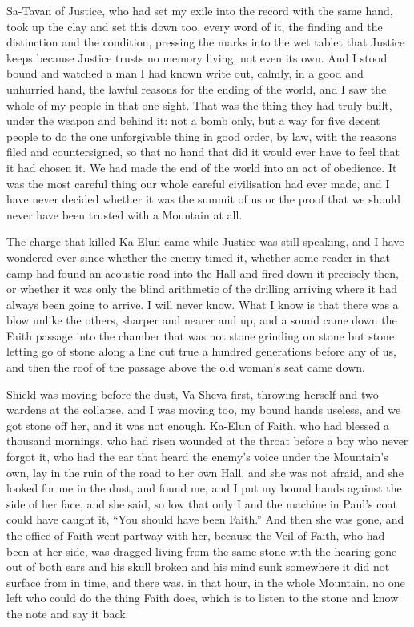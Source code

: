 Sa-Tavan of Justice, who had set my exile into the record with the same hand, took up the clay and set this down too, every word of it, the finding and the distinction and the condition, pressing the marks into the wet tablet that Justice keeps because Justice trusts no memory living, not even its own. And I stood bound and watched a man I had known write out, calmly, in a good and unhurried hand, the lawful reasons for the ending of the world, and I saw the whole of my people in that one sight. That was the thing they had truly built, under the weapon and behind it: not a bomb only, but a way for five decent people to do the one unforgivable thing in good order, by law, with the reasons filed and countersigned, so that no hand that did it would ever have to feel that it had chosen it. We had made the end of the world into an act of obedience. It was the most careful thing our whole careful civilisation had ever made, and I have never decided whether it was the summit of us or the proof that we should never have been trusted with a Mountain at all.\par

\ornament

The charge that killed Ka-Elun came while Justice was still speaking, and I have wondered ever since whether the enemy timed it, whether some reader in that camp had found an acoustic road into the Hall and fired down it precisely then, or whether it was only the blind arithmetic of the drilling arriving where it had always been going to arrive. I will never know. What I know is that there was a blow unlike the others, sharper and nearer and up, and a sound came down the Faith passage into the chamber that was not stone grinding on stone but stone letting go of stone along a line cut true a hundred generations before any of us, and then the roof of the passage above the old woman's seat came down.\par

Shield was moving before the dust, Va-Sheva first, throwing herself and two wardens at the collapse, and I was moving too, my bound hands useless, and we got stone off her, and it was not enough. Ka-Elun of Faith, who had blessed a thousand mornings, who had risen wounded at the throat before a boy who never forgot it, who had the ear that heard the enemy's voice under the Mountain's own, lay in the ruin of the road to her own Hall, and she was not afraid, and she looked for me in the dust, and found me, and I put my bound hands against the side of her face, and she said, so low that only I and the machine in Paul's coat could have caught it, ``You should have been Faith.'' And then she was gone, and the office of Faith went partway with her, because the Veil of Faith, who had been at her side, was dragged living from the same stone with the hearing gone out of both ears and his skull broken and his mind sunk somewhere it did not surface from in time, and there was, in that hour, in the whole Mountain, no one left who could do the thing Faith does, which is to listen to the stone and know the note and say it back.\par

